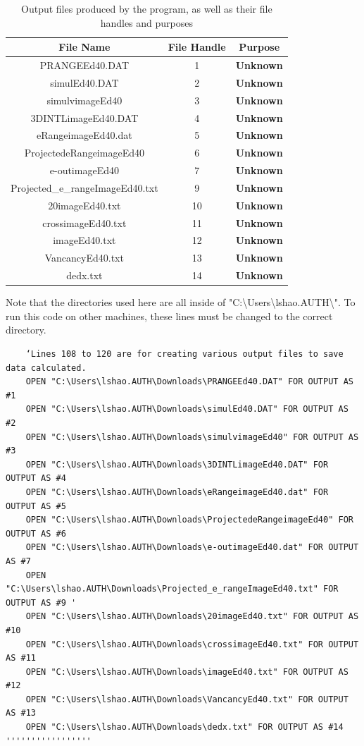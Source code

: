 \documentclass[10pt, reqno]{exam}
\begin{document}
{\begin{table}[h]
    \centering
    \caption{Output files produced by the program, as well as their file handles and purposes}
    \label{tbl:output files}
    \begin{tabular}{|c|c|c|}
        \hline
        File Name & File Handle & Purpose \\
        \hline
        PRANGEEd40.DAT  & 1 & \textbf{Unknown}  \\
        simulEd40.DAT   & 2 & \textbf{Unknown}  \\
        simulvimageEd40 & 3 & \textbf{Unknown}  \\
        3DINTLimageEd40.DAT & 4 & \textbf{Unknown}  \\
        eRangeimageEd40.dat & 5 & \textbf{Unknown}  \\
        ProjectedeRangeimageEd40    & 6 & \textbf{Unknown}  \\
        e-outimageEd40  & 7 & \textbf{Unknown}  \\
        Projected\_e\_rangeImageEd40.txt  & 9 & \textbf{Unknown}  \\
        20imageEd40.txt & 10 & \textbf{Unknown}  \\
        crossimageEd40.txt  & 11 & \textbf{Unknown}  \\
        imageEd40.txt   & 12 & \textbf{Unknown}  \\
        VancancyEd40.txt    & 13 & \textbf{Unknown}  \\
        dedx.txt    & 14 & \textbf{Unknown}  \\
        \hline
    \end{tabular}
\end{table}

Note that the directories used here are all inside of "C:\textbackslash Users\textbackslash lshao.AUTH\textbackslash ". To run this code on other machines, these lines must be changed to the correct directory.

\begin{verbatim}
    ‘Lines 108 to 120 are for creating various output files to save data calculated. 
    OPEN "C:\Users\lshao.AUTH\Downloads\PRANGEEd40.DAT" FOR OUTPUT AS #1
    OPEN "C:\Users\lshao.AUTH\Downloads\simulEd40.DAT" FOR OUTPUT AS #2
    OPEN "C:\Users\lshao.AUTH\Downloads\simulvimageEd40" FOR OUTPUT AS #3
    OPEN "C:\Users\lshao.AUTH\Downloads\3DINTLimageEd40.DAT" FOR OUTPUT AS #4
    OPEN "C:\Users\lshao.AUTH\Downloads\eRangeimageEd40.dat" FOR OUTPUT AS #5
    OPEN "C:\Users\lshao.AUTH\Downloads\ProjectedeRangeimageEd40" FOR OUTPUT AS #6
    OPEN "C:\Users\lshao.AUTH\Downloads\e-outimageEd40.dat" FOR OUTPUT AS #7
    OPEN "C:\Users\lshao.AUTH\Downloads\Projected_e_rangeImageEd40.txt" FOR OUTPUT AS #9 '
    OPEN "C:\Users\lshao.AUTH\Downloads\20imageEd40.txt" FOR OUTPUT AS #10
    OPEN "C:\Users\lshao.AUTH\Downloads\crossimageEd40.txt" FOR OUTPUT AS #11
    OPEN "C:\Users\lshao.AUTH\Downloads\imageEd40.txt" FOR OUTPUT AS #12
    OPEN "C:\Users\lshao.AUTH\Downloads\VancancyEd40.txt" FOR OUTPUT AS #13
    OPEN "C:\Users\lshao.AUTH\Downloads\dedx.txt" FOR OUTPUT AS #14 '''''''''''''''''
\end{verbatim}
}
\end{document}

